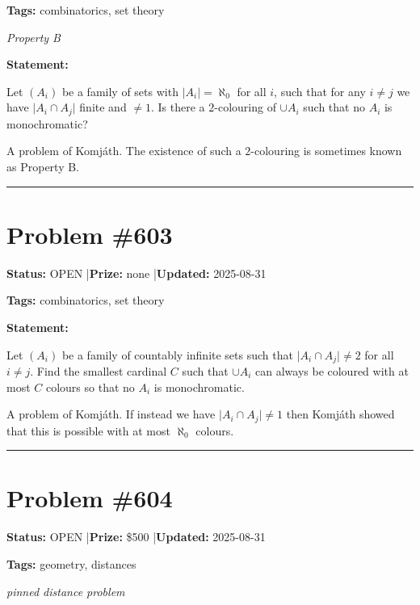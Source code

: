\documentclass{article}
\begin{document}
\noindent\textbf{Tags:} combinatorics, set theory

\medskip
\noindent\textit{Property B}


\noindent\textbf{Statement:}

Let $(A_i)$ be a family of sets with $\lvert A_i\rvert=\aleph_0$ for all $i$, such that for any $i\neq j$ we have $\lvert A_i\cap A_j\rvert$ finite and $\neq 1$. Is there a $2$-colouring of $\cup A_i$ such that no $A_i$ is monochromatic?




A problem of Komj\'{a}th. The existence of such a $2$-colouring is sometimes known as Property B.

\noindent\rule{\linewidth}{0.4pt}


\section{Problem \#603}
\label{prob:603}

\noindent\textbf{Status:} OPEN \quad|\quad \textbf{Prize:} none \quad|\quad \textbf{Updated:} 2025-08-31

\noindent\textbf{Tags:} combinatorics, set theory

\medskip

\noindent\textbf{Statement:}

Let $(A_i)$ be a family of countably infinite sets such that $\lvert A_i\cap A_j\rvert \neq 2$ for all $i\neq j$. Find the smallest cardinal $C$ such that $\cup A_i$ can always be coloured with at most $C$ colours so that no $A_i$ is monochromatic.




A problem of Komj\'{a}th. If instead we have $\lvert A_i\cap A_j\rvert \neq 1$ then Komj\'{a}th showed that this is possible with at most $\aleph_0$ colours.

\noindent\rule{\linewidth}{0.4pt}


\section{Problem \#604}
\label{prob:604}

\noindent\textbf{Status:} OPEN \quad|\quad \textbf{Prize:} \$500 \quad|\quad \textbf{Updated:} 2025-08-31

\noindent\textbf{Tags:} geometry, distances

\medskip
\noindent\textit{pinned distance problem}
\end{document}
